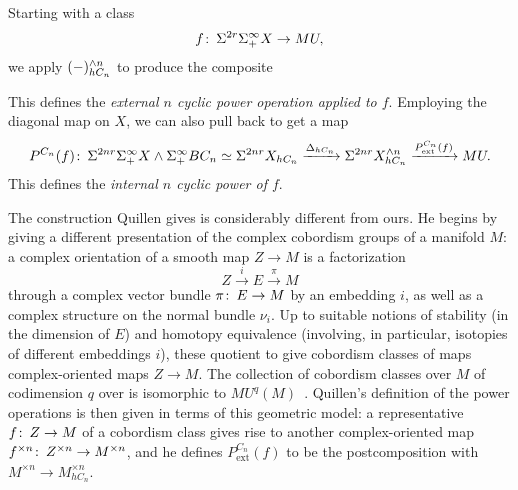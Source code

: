 \begin{definition}
Starting with a class \[f\colon\thinspace \Sigma^{2r} \Sigma^\infty_+ X \to MU,\] we apply $(-)^{\wedge n}_{hC_n}$ to produce the composite
\begin{center}
\end{center}
This defines the \textit{external $n${\th} cyclic power operation applied to $f$}.  Employing the diagonal map on $X$, we can also pull back to get a map \[P^{C_n}(f)\colon\thinspace \Sigma^{2nr} \Sigma^\infty_+ X \wedge \Sigma^\infty_+ BC_n \simeq \Sigma^{2nr} X_{hC_n} \xrightarrow{\Delta_{hC_n}} \Sigma^{2nr} X^{\wedge n}_{hC_n} \xrightarrow{P^{C_n}_{\mathrm{ext}}(f)} MU.\]  This defines the \textit{internal $n${\th} cyclic power of $f$}.
\end{definition}

\begin{remark}
The construction Quillen gives is considerably different from ours.  He begins by giving a different presentation of the complex cobordism groups of a manifold $M$: a complex orientation of a smooth map $Z \to M$ is a factorization \[Z \xrightarrow{i} E \xrightarrow{\pi} M\] through a complex vector bundle $\pi\colon\thinspace E \to M$ by an embedding $i$, as well as a complex structure on the normal bundle $\nu_i$.  Up to suitable notions of stability (in the dimension of $E$) and homotopy equivalence (involving, in particular, isotopies of different embeddings $i$), these quotient to give cobordism classes of maps complex-oriented maps $Z \to M$.  The collection of cobordism classes over $M$ of codimension $q$ over is isomorphic to $MU^q(M)$~\cite[Proposition 1.2]{Quillen}.  Quillen's definition of the power operations is then given in terms of this geometric model: a representative $f\colon\thinspace Z \to M$ of a cobordism class gives rise to another complex-oriented map $f^{\times n}\colon\thinspace Z^{\times n} \to M^{\times n}$, and he defines $P^{C_n}_{\mathrm{ext}}(f)$ to be the postcomposition with $M^{\times n} \to M^{\times n}_{hC_n}$.
\end{remark}

